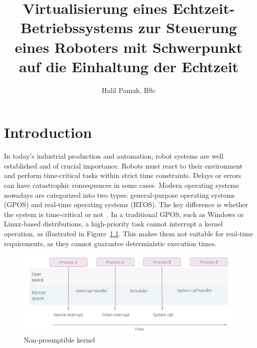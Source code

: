 \documentclass[MMR,Master,english]{twbook}
\title{Virtualisierung eines Echtzeit-Betriebssystems zur Steuerung eines Roboters mit Schwerpunkt auf die
Einhaltung der Echtzeit}
\author{Halil Pamuk, BSc}
\begin{document}
\maketitle
%
%
%



\chapter{Introduction}\label{cha:introduction}
In today's industrial production and automation, robot systems are well established and of crucial importance. Robots must react to their environment and perform time-critical tasks within strict time constraints. Delays or errors can have catastrophic consequences in some cases. Modern operating systems nowadays are categorized into two types:  general-purpose operating systems (GPOS) and real-time operating systems (RTOS). The key difference is whether the system is time-critical or not~\cite{canbazPerformanceAnalysisRealtime2022}. In a traditional GPOS, such as Windows or Linux-based distributions, a high-priority task cannot interrupt a kernel operation, as illustrated in Figure~\ref{fig:kernel_generic}. This makes them not suitable for real-time requirements, as they cannot guarantee deterministic execution times.

\begin{figure}[H]
	\centering
	\includegraphics[width=0.75\columnwidth]{img/introduction/kernel_generic.png}
	\caption[Non-preemptible kernel]{Non-preemptible kernel~\cite{WhatRealtimeLinuxa}}
	\label{fig:kernel_generic}
\end{figure}
\end{document}
